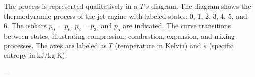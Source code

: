 The process is represented qualitatively in a \( T \)-\( s \) diagram. The diagram shows the thermodynamic process of the jet engine with labeled states: \( 0 \), \( 1 \), \( 2 \), \( 3 \), \( 4 \), \( 5 \), and \( 6 \). The isobars \( p_0 = p_6 \), \( p_2 = p_3 \), and \( p_5 \) are indicated. The curve transitions between states, illustrating compression, combustion, expansion, and mixing processes. The axes are labeled as \( T \) (temperature in Kelvin) and \( s \) (specific entropy in \( \text{kJ}/\text{kg·K} \)).

---